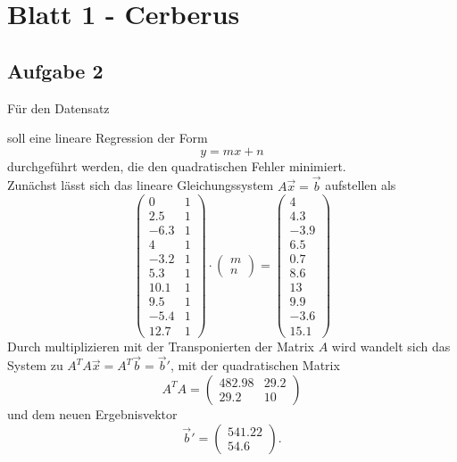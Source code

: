 \documentclass{article}
\begin{document}
\section*{Blatt 1 - Cerberus}
\subsection*{Aufgabe 2}
Für den Datensatz
\begin{table}
    \centering

\end{table}
soll eine lineare Regression der Form
\[
y = mx + n
\]
durchgeführt werden, die den quadratischen Fehler minimiert.\\
Zunächst lässt sich das lineare Gleichungssystem $A\vec{x}=\vec{b}$ aufstellen als
\[
\begin{pmatrix}
   0  & 1\\
 2.5  & 1\\
-6.3  & 1\\
   4  & 1\\ 
-3.2  & 1\\
 5.3  & 1\\
10.1  & 1\\
 9.5  & 1\\
-5.4  & 1\\
12.7  & 1
\end{pmatrix}\cdot
\begin{pmatrix}
m\\
n
\end{pmatrix} = 
\begin{pmatrix}
4\\
4.3\\
-3.9\\
6.5\\
0.7\\
8.6\\
13\\
9.9\\
-3.6\\
15.1
\end{pmatrix}
\]
Durch multiplizieren mit der Transponierten der Matrix $A$ wird wandelt sich das
System zu $A^TA\vec{x} = A^T \vec{b} = \vec{b}'$, mit der quadratischen Matrix
\[
A^TA = \begin{pmatrix}
482.98 & 29.2 \\
  29.2  &  10 
\end{pmatrix}
\]
und dem neuen Ergebnisvektor
\[
\vec{b}' = \begin{pmatrix}
541.22\\
  54.6
\end{pmatrix}\text{.}
\]
\end{document}
